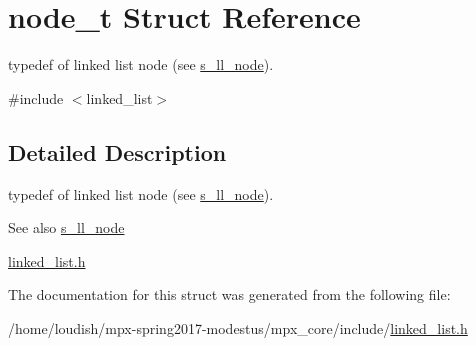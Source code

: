 \hypertarget{structnode__t}{}\section{node\+\_\+t Struct Reference}
\label{structnode__t}


typedef of linked list node (see \hyperlink{structs__ll__node}{s\+\_\+ll\+\_\+node}).  




{\ttfamily \#include $<$linked\+\_\+list$>$}



\subsection{Detailed Description}
typedef of linked list node (see \hyperlink{structs__ll__node}{s\+\_\+ll\+\_\+node}). 

\begin{DoxySeeAlso}{See also}
\hyperlink{structs__ll__node}{s\+\_\+ll\+\_\+node} 

\hyperlink{linked__list_8h}{linked\+\_\+list.\+h} 
\end{DoxySeeAlso}


The documentation for this struct was generated from the following file\+:\begin{DoxyCompactItemize}
\item 
/home/loudish/mpx-\/spring2017-\/modestus/mpx\+\_\+core/include/\hyperlink{linked__list_8h}{linked\+\_\+list.\+h}\end{DoxyCompactItemize}
